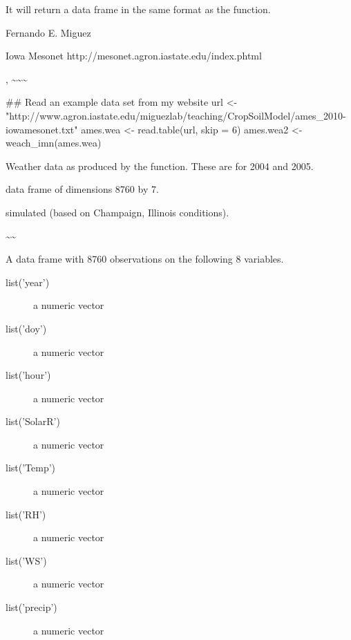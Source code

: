 \documentclass[letterpaper]{book}
\begin{document}
%
\begin{Value}
It will return a data frame in the same format as the
 function.
\end{Value}
%
\begin{Author}\relax
Fernando E. Miguez
\end{Author}
%
\begin{References}\relax
Iowa Mesonet http://mesonet.agron.iastate.edu/index.phtml

\end{References}
%
\begin{SeeAlso}\relax
{} 
, \textasciitilde{}\textasciitilde{}\textasciitilde{}
\end{SeeAlso}
%
\begin{Examples}
\begin{ExampleCode}
## Read an example data set from my website
url <- "http://www.agron.iastate.edu/miguezlab/teaching/CropSoilModel/ames_2010-iowamesonet.txt"
ames.wea <- read.table(url, skip = 6)
ames.wea2 <- weach_imn(ames.wea)
\end{ExampleCode}
\end{Examples}
%
\begin{Description}\relax
Weather data as produced by the 
function.  These are for 2004 and 2005.
\end{Description}
%
\begin{Format}
data frame of dimensions 8760 by 7.
\end{Format}
%
\begin{Source}\relax
simulated (based on Champaign, Illinois conditions).
\end{Source}
%
\begin{Description}\relax

\textasciitilde{}\textasciitilde{}
\end{Description}
%
\begin{Format}
A data frame with 8760 observations on the following 8 variables.
\begin{description}
 \item[list('year')] a numeric vector\item[list('doy')] a
numeric vector\item[list('hour')] a numeric vector
\item[list('SolarR')] a numeric vector\item[list('Temp')] a numeric
vector\item[list('RH')] a numeric vector\item[list('WS')] a numeric
vector\item[list('precip')] a numeric vector
\end{description}
\end{Format}
\end{document}
